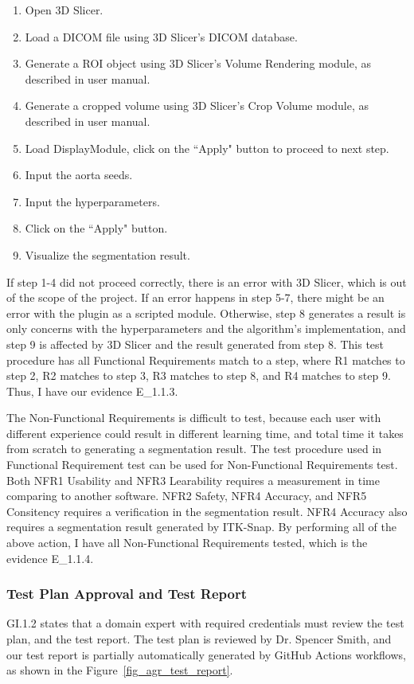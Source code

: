 \begin{enumerate}
  \item Open 3D Slicer.
  \item Load a DICOM file using 3D Slicer's DICOM database.  
  \item Generate a ROI object using 3D Slicer's Volume Rendering module, as described in user manual.
  \item Generate a cropped volume using 3D Slicer's Crop Volume module, as described in user manual.
  \item Load \progname{}DisplayModule, click on the ``Apply" button to proceed to next step.
  \item Input the aorta seeds.
  \item Input the hyperparameters.
  \item Click on the ``Apply" button.
  \item Visualize the segmentation result.
\end{enumerate}

If step 1-4 did not proceed correctly, there is an error with 3D Slicer, which is out of the scope of the project. If an error happens in step 5-7, there might be an error with the plugin as a scripted module. Otherwise, step 8 generates a result is only concerns with the hyperparameters and the algorithm's implementation, and step 9 is affected by 3D Slicer and the result generated from step 8. This test procedure has all Functional Requirements match to a step, where R1 matches to step 2, R2 matches to step 3, R3 matches to step 8, and R4 matches to step 9. Thus, I have our evidence E\_1.1.3.

The Non-Functional Requirements is difficult to test, because each user with different experience could result in different learning time, and total time it takes from scratch to generating a segmentation result. The test procedure used in Functional Requirement test can be used for Non-Functional Requirements test. Both NFR1 Usability and NFR3 Learability requires a measurement in time comparing to another software. NFR2 Safety, NFR4 Accuracy, and NFR5 Consitency requires a verification in the segmentation result. NFR4 Accuracy also requires a segmentation result generated by ITK-Snap. By performing all of the above action, I have all Non-Functional Requirements tested, which is the evidence E\_1.1.4.

\subsubsection{Test Plan Approval and Test Report}
GI.1.2 states that a domain expert with required credentials must review the test plan, and the test report. The test plan is reviewed by Dr. Spencer Smith, and our test report is partially automatically generated by GitHub Actions workflows, as shown in the Figure~\ref{fig_agr_test_report}.

